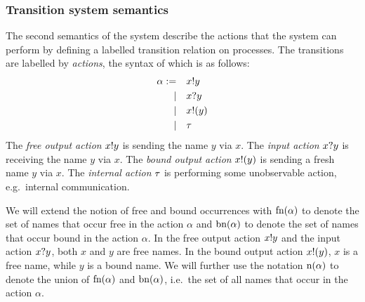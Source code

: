 \subsubsection{Transition system semantics}
The second semantics of the system describe the actions that the system can perform by defining a labelled transition relation on processes.
The transitions are labelled by \emph{actions}, the syntax of which is as follows:
\begin{align*}
  \alpha := &&& x ! y \\
  |&&& x ? y \\
  |&&& x ! (y) \\
  |&&& \tau
\end{align*}
The \emph{free output action} \( x ! y \) is sending the name \( y \) via \( x \).
The \emph{input action} \( x ? y \) is receiving the name \( y \) via \( x \).
The \emph{bound output action} \( x ! (y) \) is sending a fresh name \( y \) via \( x \).
The \emph{internal action} \( \tau \) is performing some unobservable action, e.g.\ internal communication.

We will extend the notion of free and bound occurrences with 
\( \textrm{fn}(\alpha) \) to denote the set of names that occur free in
the action \( \alpha \) and  \( \textrm{bn}(\alpha) \) to
denote the set of names that occur bound in the action \( \alpha \).
In the free output action \( x ! y \) and the input action
\( x ? y \), both \( x \) and \( y \) are free names.  In the
bound output action \( x ! (y) \), \( x \) is a free name, while
\( y \) is a bound name.  We will further use the notation
\( \textrm{n}(\alpha) \) to denote the union of \( \textrm{fn}(\alpha) \)
and \( \textrm{bn}(\alpha) \), i.e.\ the set of all names that occur
in the action \( \alpha \).

